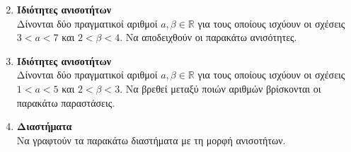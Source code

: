 \documentclass[twoside,nofonts,internet]{askhseis}
\begin{document}
\begin{enumerate}
\begin{multicols}{2}
\end{multicols}
\item \textbf{Ιδιότητες ανισοτήτων}\\
Δίνονται δύο πραγματικοί αριθμοί $ a,\beta\in\mathbb{R} $ για τους οποίους ισχύουν οι σχέσεις $ 3<a<7 $ και $ 2<\beta<4 $. Να αποδειχθούν οι παρακάτω ανισότητες.
\begin{multicols}{2}
\end{multicols}
\item \textbf{Ιδιότητες ανισοτήτων}\\
Δίνονται δύο πραγματικοί αριθμοί $ a,\beta\in\mathbb{R} $ για τους οποίους ισχύουν οι σχέσεις $ 1<a<5 $ και $ 2<\beta<3 $. Να βρεθεί μεταξύ ποιών αριθμών βρίσκονται οι παρακάτω παραστάσεις.
\begin{multicols}{2}
\end{multicols}
\item \textbf{Διαστήματα}\\
Να γραφτούν τα παρακάτω διαστήματα με τη μορφή ανισοτήτων.
\begin{multicols}{3}
\begin{rlist}
\item $ [3,7] $
\item $ [-2,5) $
\item $ (0,3] $
\item $ (-\infty,4] $
\item $ (0,+\infty) $
\item $ (-4,4) $

\end{rlist}
\end{multicols}
\end{enumerate}
\end{document}

